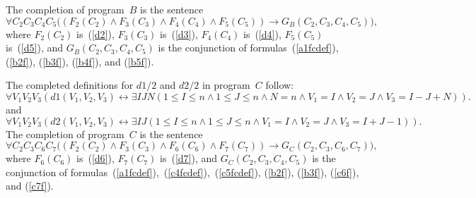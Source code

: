 \documentclass[11pt]{article}
\def\lrar{\leftrightarrow}
\def\beq{\begin{equation}}
\def\eeq#1{\label{#1}\end{equation}}
\begin{document}
\begin{adjustwidth}{-1cm}{-1cm}
The completion of program~$B$ is the sentence
$$\forall C_2 C_3 C_4 C_5\big((F_2(C_2)\wedge F_3(C_3) \wedge F_4(C_4) \wedge F_5(C_5))\to  G_B(C_2, C_3, C_4, C_5)\big),$$
where $F_2(C_2)$ is~(\ref{d2}), $F_3(C_3)$ is~(\ref{d3}), $F_4(C_4)$ is~(\ref{d4}),
$F_5(C_5)$ is~(\ref{d5}),
 and $G_B(C_2, C_3, C_4, C_5)$ is the conjunction of
formulas~(\ref{a1fcdef}), (\ref{b2f}), (\ref{b3f}), (\ref{b4f}), and (\ref{b5f}).


The completed definitions for $d1/2$ and $d2/2$ in program~$C$ follow:
\beq
\forall V_1V_2V_3( d1(V_1,V_2,V_3)\lrar
\exists I J  N(1\leq I\leq n \land 1\leq J\leq n  
 \wedge N=n \land V_1=I\land V_2=J \land V_3= I-J+N)).
\eeq{c4fcdef}
and
\beq
\forall V_1V_2V_3(d2(V_1,V_2,V_3)\lrar 
\exists I J  (1\leq I\leq n \land 1\leq J\leq n 
\wedge V_1=I \land V_2=J \land V_3= I+J-1)).
\eeq{c5fcdef}
The completion of program~$C$ is the sentence
$$\forall C_2 C_3 C_6 C_7\big((F_2(C_2)\wedge F_3(C_3) \wedge F_6(C_6) \wedge F_7(C_7))\to  G_C(C_2, C_3, C_6, C_7)\big),$$
where  $F_6(C_6)$ is~(\ref{d6}),
$F_7(C_7)$ is~(\ref{d7}),
 and $G_C(C_2, C_3, C_4, C_5)$ is the conjunction of
formulas~(\ref{a1fcdef}),~(\ref{c4fcdef}),~(\ref{c5fcdef}),  (\ref{b2f}), (\ref{b3f}), (\ref{c6f}), and (\ref{c7f}).




\end{adjustwidth}
\end{document}
